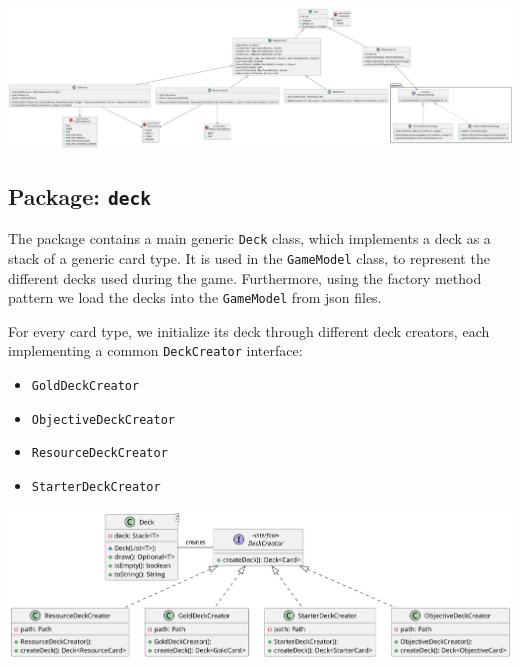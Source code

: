 \documentclass{article}
\begin{document}
\begin{center}
    \hspace*{-3cm}\includegraphics[scale=0.18]{card.png}
\end{center}
\newpage
\noindent

\subsection{Package: \texttt{deck}}
The package contains a main generic \texttt{Deck} class, which implements a deck as a stack of a generic card type.
It is used in the \texttt{GameModel} class, to represent the different decks used during the game. 
Furthermore, using the factory method pattern we load the decks into the \texttt{GameModel} from json files.

\noindent For every card type, we initialize its deck through different deck creators, each implementing a common \texttt{DeckCreator} interface:
\begin{itemize}
    \item \texttt{GoldDeckCreator}
    \item \texttt{ObjectiveDeckCreator}
    \item \texttt{ResourceDeckCreator}
    \item \texttt{StarterDeckCreator}
\end{itemize}

\begin{center}
    \hspace*{-1cm}\includegraphics[scale=0.15]{deck.png}
\end{center}

\newpage
\end{document}
